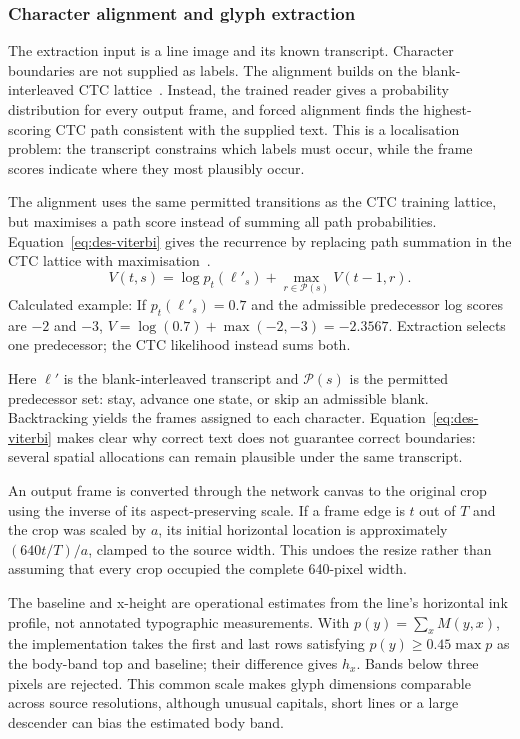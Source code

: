 \subsubsection{Character alignment and glyph extraction}
\label{sec:des-alignment}
The extraction input is a line image and its known transcript. Character boundaries are not supplied as labels. The alignment builds on the blank-interleaved CTC lattice~\cite[PDF pp.~4--5]{graves2006}. Instead, the trained reader gives a probability distribution for every output frame, and forced alignment finds the highest-scoring CTC path consistent with the supplied text. This is a localisation problem: the transcript constrains which labels must occur, while the frame scores indicate where they most plausibly occur.


The alignment uses the same permitted transitions as the CTC training lattice, but maximises a path score instead of summing all path probabilities. Equation~\ref{eq:des-viterbi} gives the recurrence by replacing path summation in the CTC lattice with maximisation~\cite[PDF pp.~4--5]{graves2006}.
\begin{equation}
V(t,s)=\log p_t(\ell'_s)+\max_{r\in\mathcal P(s)}V(t-1,r).
\label{eq:des-viterbi}
\end{equation}
Calculated example: If $p_t(\ell'_s)=0.7$ and the admissible predecessor log scores are $-2$ and $-3$, $V=\log(0.7)+\max(-2,-3)=-2.3567$. Extraction selects one predecessor; the CTC likelihood instead sums both.

Here $\ell'$ is the blank-interleaved transcript and $\mathcal P(s)$ is the permitted predecessor set: stay, advance one state, or skip an admissible blank. Backtracking yields the frames assigned to each character. Equation~\ref{eq:des-viterbi} makes clear why correct text does not guarantee correct boundaries: several spatial allocations can remain plausible under the same transcript.

An output frame is converted through the network canvas to the original crop using the inverse of its aspect-preserving scale. If a frame edge is $t$ out of $T$ and the crop was scaled by $a$, its initial horizontal location is approximately $(640t/T)/a$, clamped to the source width. This undoes the resize rather than assuming that every crop occupied the complete 640-pixel width.

The baseline and x-height are operational estimates from the line's horizontal ink profile, not annotated typographic measurements. With $p(y)=\sum_x M(y,x)$, the implementation takes the first and last rows satisfying $p(y)\geq0.45\max p$ as the body-band top and baseline; their difference gives $h_x$. Bands below three pixels are rejected. This common scale makes glyph dimensions comparable across source resolutions, although unusual capitals, short lines or a large descender can bias the estimated body band.

